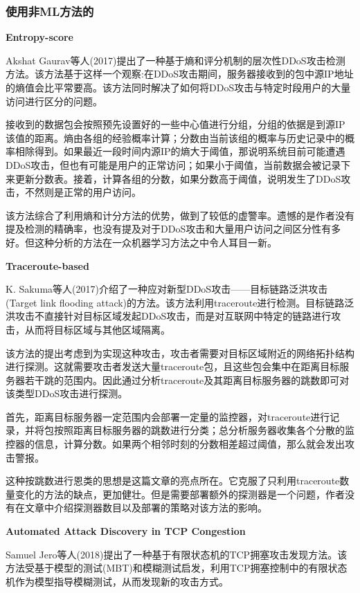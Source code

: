\documentclass[12pt]{article} %
\begin{document}
\subsubsection{使用非ML方法的}
\label{nonml}

\textbf{Entropy-score}

Akshat Gaurav等人(2017)提出了一种基于熵和评分机制的层次性DDoS攻击检测方法。该方法基于这样一个观察:在DDoS攻击期间，服务器接收到的包中源IP地址的熵值会比平常要高。该方法同时解决了如何将DDoS攻击与特定时段用户的大量访问进行区分的问题。

接收到的数据包会按照预先设置好的一些中心值进行分组，分组的依据是到源IP该值的距离。熵由各组的经验概率计算；分数由当前该组的概率与历史记录中的概率相除得到。如果最近一段时间内源IP的熵大于阈值，那说明系统目前可能遭遇DDoS攻击，但也有可能是用户的正常访问；如果小于阈值，当前数据会被记录下来更新分数表。接着，计算各组的分数，如果分数高于阈值，说明发生了DDoS攻击，不然则是正常的用户访问。

该方法综合了利用熵和计分方法的优势，做到了较低的虚警率。遗憾的是作者没有提及检测的精确率，也没有提及对于DDoS攻击和大量用户访问之间区分性有多好。但这种分析的方法在一众机器学习方法之中令人耳目一新。

\textbf{Traceroute-based}

K. Sakuma等人(2017)介绍了一种应对新型DDoS攻击——目标链路泛洪攻击(Target link flooding attack)的方法。该方法利用traceroute进行检测。目标链路泛洪攻击不直接针对目标区域发起DDoS攻击，而是对互联网中特定的链路进行攻击，从而将目标区域与其他区域隔离。

该方法的提出考虑到为实现这种攻击，攻击者需要对目标区域附近的网络拓扑结构进行探测。这就需要攻击者发送大量traceroute包，且这些包会集中在距离目标服务器若干跳的范围内。因此通过分析traceroute及其距离目标服务器的跳数即可对该类型DDoS攻击进行探测。

首先，距离目标服务器一定范围内会部署一定量的监控器，对traceroute进行记录，并将包按照距离目标服务器的跳数进行分类；总分析服务器收集各个分散的监控器的信息，计算分数。如果两个相邻时刻的分数相差超过阈值，那么就会发出攻击警报。

这种按跳数进行恩类的思想是这篇文章的亮点所在。它克服了只利用traceroute数量变化的方法的缺点，更加健壮。但是需要部署额外的探测器是一个问题，作者没有在文章中介绍探测器数目以及部署的策略对该方法的影响。

\textbf{Automated Attack Discovery in TCP Congestion}

Samuel Jero等人(2018)提出了一种基于有限状态机的TCP拥塞攻击发现方法。该方法受基于模型的测试(MBT)和模糊测试启发，利用TCP拥塞控制中的有限状态机作为模型指导模糊测试，从而发现新的攻击方式。
\end{document}
